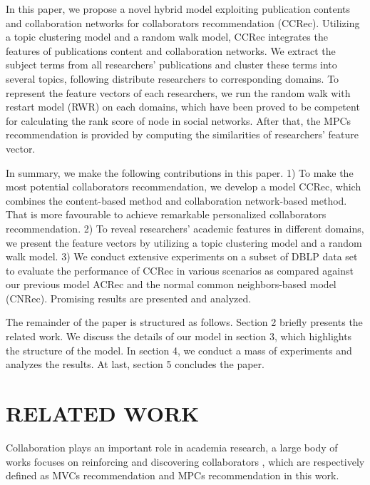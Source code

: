 \documentclass[review]{elsarticle}
\begin{document}
In this paper, we propose a novel hybrid model exploiting publication contents and collaboration networks for collaborators recommendation (CCRec). Utilizing a topic clustering model \cite{pan2010research} \cite{pham2011clustering} and a random walk model, CCRec integrates the features of publications content and collaboration networks. We extract the subject terms from all researchers' publications and cluster these terms into several topics, following distribute researchers to corresponding domains. To represent the feature vectors of each researchers, we run the random walk with restart model (RWR) on each domains, which have been proved  to be competent for calculating the rank score of node in social networks. After that, the MPCs recommendation is provided by computing the similarities of researchers' feature vector.

In summary, we make the following contributions in this paper. 1) To make the most potential collaborators recommendation, we develop a model CCRec, which combines the content-based method and collaboration network-based method. That is more favourable to achieve remarkable personalized collaborators recommendation. 2) To reveal researchers' academic features in different domains, we present the feature vectors by utilizing a topic clustering model and a random walk model. 3) We conduct extensive experiments on a subset of DBLP data set to evaluate the performance of CCRec in various scenarios as compared against our previous model ACRec and the normal common neighbors-based model (CNRec). Promising results are presented and analyzed.

The remainder of the paper is structured as follows. Section 2 briefly presents the related work. We discuss the details of our model in section 3, which highlights the structure of the model. In section 4, we conduct a mass of experiments and analyzes the results. At last, section 5 concludes the paper.

\section{RELATED WORK}
Collaboration plays an important role in academia research, a large body of works focuses on reinforcing and discovering collaborators \cite{lopes2010collaboration}, which are respectively defined as MVCs recommendation and MPCs recommendation in this work.
\end{document}
